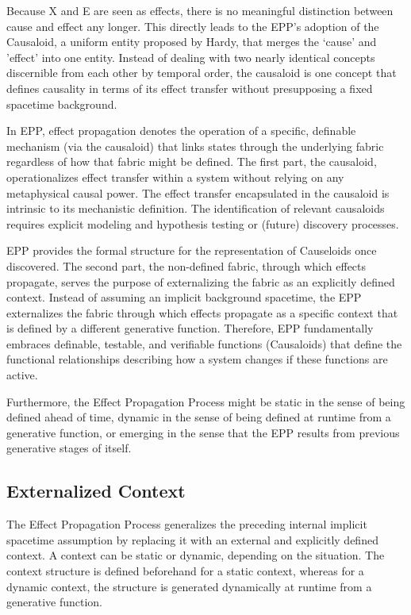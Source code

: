 Because X and E are seen as effects, there is no meaningful distinction between cause and effect any longer. This directly leads to the EPP’s adoption of the Causaloid, a uniform entity proposed by Hardy\cite{HardyDynamicCausalStructure}, that merges the ‘cause' and 'effect' into one entity. Instead of dealing with two nearly identical concepts discernible from each other by temporal order, the causaloid is one concept that defines causality in terms of its effect transfer without presupposing a fixed spacetime background\cite{HardyDynamicCausalStructure}.

In EPP, effect propagation denotes the operation of a specific, definable mechanism (via the causaloid) that links states through the underlying fabric regardless of how that fabric might be defined. The first part, the causaloid, operationalizes effect transfer within a system without relying on any metaphysical causal power. The effect transfer encapsulated in the causaloid is intrinsic to its mechanistic definition. The identification of relevant causaloids requires explicit modeling and hypothesis testing or (future) discovery processes. 

EPP provides the formal structure for the representation of Causeloids once discovered. The second part, the non-defined fabric, through which effects propagate, serves the purpose of externalizing the fabric as an explicitly defined context. Instead of assuming an implicit background spacetime, the EPP externalizes the fabric through which effects propagate as a specific context that is defined by a different generative function. Therefore, EPP fundamentally embraces definable, testable, and verifiable functions (Causaloids) that define the functional relationships describing how a system changes if these functions are active.

Furthermore, the Effect Propagation Process might be static in the sense of being defined ahead of time, dynamic in the sense of being defined at runtime from a generative function, or emerging in the sense that the EPP results from previous generative stages of itself.

\newpage

\subsection{Externalized Context}
\label{subsec:Externalized_Context}

The Effect Propagation Process generalizes the preceding internal implicit spacetime assumption by replacing it with an external and explicitly defined context.
A context can be static or dynamic, depending on the situation. The context structure is defined beforehand for a static context, whereas for a dynamic context, the structure is generated dynamically at runtime from a generative function.

